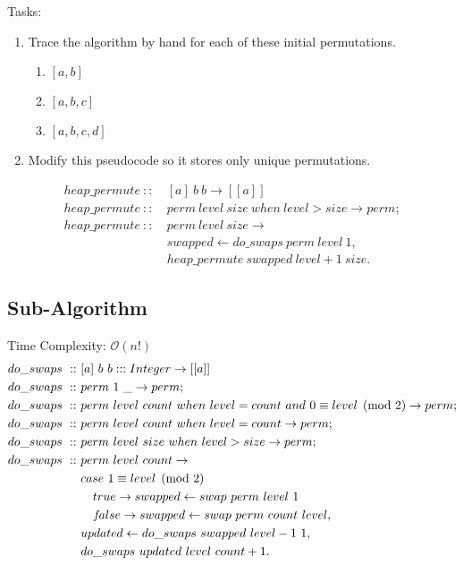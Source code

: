 \documentclass[a4paper,10pt]{book}
\newcommand{\false}{f\kern-0.25ex{alse}}
\begin{document}
Tasks:
\begin{enumerate}
\item Trace the algorithm by hand for each of these initial permutations.
\begin{enumerate}
\item$[a,b]$ 
\item$[a,b,c]$ 
\item$[a,b,c,d]$
\end{enumerate}
\item Modify this pseudocode so it stores only unique permutations.
\end{enumerate}

\begin{align*}
heap\_permute\ ::\ &[a]\ b\ b\rightarrow [[a]]\\
heap\_permute\ ::\ & perm\ level\ size\ when\ level>size\rightarrow perm;\\
heap\_permute\ ::\ &perm\ level\ size\rightarrow\\
	&swapped\leftarrow do\_swaps\ perm\ level\ 1,\\
	&heap\_permute\ swapped\ level+1\ size.
\end{align*}

\subsection{Sub-Algorithm}Time Complexity: $\mathcal{O}(n!)$
\begin{align*}
do\_swaps\ ::\ &[a]\ b\ b:::Integer\rightarrow[[a]]\\
do\_swaps\ ::\ &perm\ 1\ \_\rightarrow perm;\\
do\_swaps\ ::\ &perm\ level\ count\ when\ level=count\ and\ 0\equiv level\pmod 2\rightarrow perm;\\
do\_swaps\ ::\ &perm\ level\ count\ when\ level = count\rightarrow perm;\\
do\_swaps\ ::\ &perm\ level\ size\ when\ level>size\rightarrow perm;\\
do\_swaps\ ::\ &perm\ level\ count\rightarrow\\
	&case\ 1\equiv level\pmod 2\\
	&\quad true\rightarrow swapped\leftarrow swap\ perm\ level\ 1\\
	&\quad\false\rightarrow swapped\leftarrow swap\ perm\ count\ level,\\
	&updated\leftarrow do\_swaps\ swapped\ level-1\ 1,\\
	&do\_swaps\ updated\ level\ count+1.
\end{align*}
\end{document}

